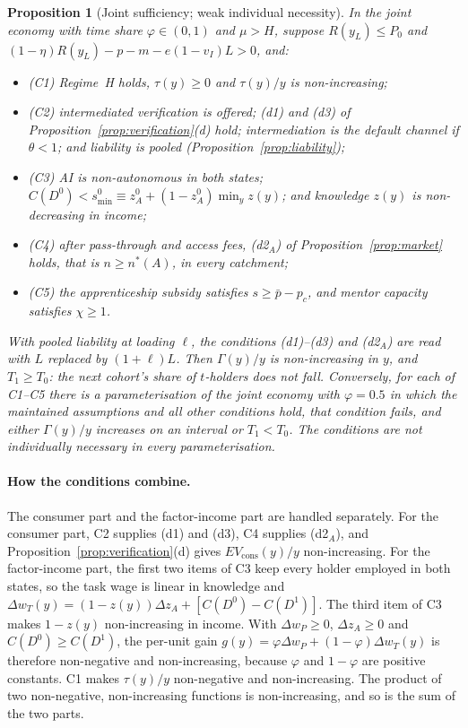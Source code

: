\documentclass[12pt]{article}
\newtheorem{proposition}{Proposition}
\theoremstyle{remark}
\begin{document}
\begin{proposition}[Joint sufficiency; weak individual necessity]\label{prop:synthesis}
In the joint economy with time share $\varphi\in(0,1)$ and $\mu>H$, suppose $R(y_L)\le P_0$ and $(1-\eta)R(y_L)-p-m-e(1-v_I)L>0$, and:
\begin{itemize}[itemsep=0pt]
\item[] (C1) Regime~H holds, $\tau(y)\ge0$ and $\tau(y)/y$ is non-increasing;
\item[] (C2) intermediated verification is offered; (d1) and (d3) of Proposition~\ref{prop:verification}(d) hold; intermediation is the default channel if $\theta<1$; and liability is pooled (Proposition~\ref{prop:liability});
\item[] (C3) AI is non-autonomous in both states; $C(D^0)<s^0_{\min}\equiv z_A^0+(1-z_A^0)\min_y z(y)$; and knowledge $z(y)$ is non-decreasing in income;
\item[] (C4) after pass-through and access fees, (d2$_A$) of Proposition~\ref{prop:market} holds, that is $n\ge n^*(A)$, in every catchment;
\item[] (C5) the apprenticeship subsidy satisfies $s\ge\bar p-p_c$, and mentor capacity satisfies $\chi\ge1$.
\end{itemize}
With pooled liability at loading $\ell$, the conditions (d1)--(d3) and (d2$_A$) are read with $L$ replaced by $(1+\ell)L$.
Then $\Gamma(y)/y$ is non-increasing in $y$, and $T_1\ge T_0$: the next cohort's share of $t$-holders does not fall. Conversely, for each of C1--C5 there is a parameterisation of the joint economy with $\varphi=0.5$ in which the maintained assumptions and all other conditions hold, that condition fails, and either $\Gamma(y)/y$ increases on an interval or $T_1<T_0$. The conditions are not individually necessary in every parameterisation.
\end{proposition}

\paragraph{How the conditions combine.} The consumer part and the factor-income part are handled separately. For the consumer part, C2 supplies (d1) and (d3), C4 supplies (d2$_A$), and Proposition~\ref{prop:verification}(d) gives $EV_{\text{cons}}(y)/y$ non-increasing. For the factor-income part, the first two items of C3 keep every holder employed in both states, so the task wage is linear in knowledge and $\Delta w_T(y)=(1-z(y))\Delta z_A+[C(D^0)-C(D^1)]$. The third item of C3 makes $1-z(y)$ non-increasing in income. With $\Delta w_P\ge0$, $\Delta z_A\ge0$ and $C(D^0)\ge C(D^1)$, the per-unit gain $g(y)=\varphi\Delta w_P+(1-\varphi)\Delta w_T(y)$ is therefore non-negative and non-increasing, because $\varphi$ and $1-\varphi$ are positive constants. C1 makes $\tau(y)/y$ non-negative and non-increasing. The product of two non-negative, non-increasing functions is non-increasing, and so is the sum of the two parts.
\end{document}

